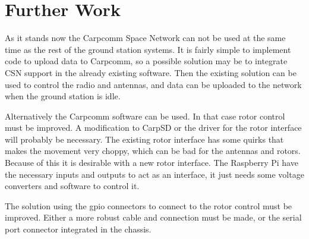 \section{Further Work}
As it stands now the Carpcomm Space Network can not be used at the same time as the rest of the ground station systems. It is fairly simple to implement code to upload data to Carpcomm, so a possible solution may be to integrate CSN support in the already existing software. Then the existing solution can be used to control the radio and antennas, and data can be uploaded to the network when the ground station is idle.

Alternatively the Carpcomm software can be used. In that case rotor control must be improved. A modification to CarpSD or the driver for the rotor interface will probably be necessary. The existing rotor interface has some quirks that makes the movement very choppy, which can be bad for the antennas and rotors. Because of this it is desirable with a new rotor interface. The Raspberry Pi have the necessary inputs and outputs to act as an interface, it just needs some voltage converters and software to control it.

The solution using the gpio connectors to connect to the rotor control must be improved. Either a more robust cable and connection must be made, or the serial port connector integrated in the chassis.